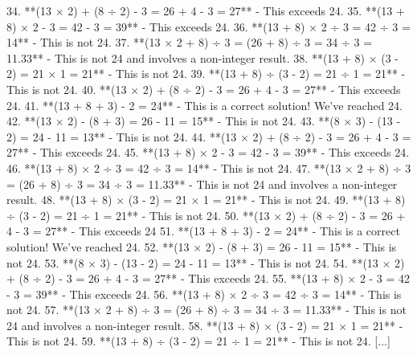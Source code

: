 \begin{dialogue}
\begin{small}
\begin{spverbatim}
34. **(13 × 2) + (8 ÷ 2) - 3 = 26 + 4 - 3 = 27**
    - This exceeds 24.
35. **(13 + 8) × 2 - 3 = 42 - 3 = 39**
    - This exceeds 24.
36. **(13 + 8) × 2 ÷ 3 = 42 ÷ 3 = 14**
    - This is not 24.
37. **(13 × 2 + 8) ÷ 3 = (26 + 8) ÷ 3 = 34 ÷ 3 = 11.33**
    - This is not 24 and involves a non-integer result.
38. **(13 + 8) × (3 - 2) = 21 × 1 = 21**
    - This is not 24.
39. **(13 + 8) ÷ (3 - 2) = 21 ÷ 1 = 21**
    - This is not 24.
40. **(13 × 2) + (8 ÷ 2) - 3 = 26 + 4 - 3 = 27**
    - This exceeds 24.
41. **(13 + 8 + 3) - 2 = 24**
    - This is a correct solution! We've reached 24.
42. **(13 × 2) - (8 + 3) = 26 - 11 = 15**
    - This is not 24.
43. **(8 × 3) - (13 - 2) = 24 - 11 = 13**
    - This is not 24.
44. **(13 × 2) + (8 ÷ 2) - 3 = 26 + 4 - 3 = 27**
    - This exceeds 24.
45. **(13 + 8) × 2 - 3 = 42 - 3 = 39**
    - This exceeds 24.
46. **(13 + 8) × 2 ÷ 3 = 42 ÷ 3 = 14**
    - This is not 24.
47. **(13 × 2 + 8) ÷ 3 = (26 + 8) ÷ 3 = 34 ÷ 3 = 11.33**
    - This is not 24 and involves a non-integer result.
48. **(13 + 8) × (3 - 2) = 21 × 1 = 21**
    - This is not 24.
49. **(13 + 8) ÷ (3 - 2) = 21 ÷ 1 = 21**
    - This is not 24.
50. **(13 × 2) + (8 ÷ 2) - 3 = 26 + 4 - 3 = 27**
    - This exceeds 24
51. **(13 + 8 + 3) - 2 = 24**
    - This is a correct solution! We've reached 24.
52. **(13 × 2) - (8 + 3) = 26 - 11 = 15**
    - This is not 24.
53. **(8 × 3) - (13 - 2) = 24 - 11 = 13**
    - This is not 24.
54. **(13 × 2) + (8 ÷ 2) - 3 = 26 + 4 - 3 = 27**
    - This exceeds 24.
55. **(13 + 8) × 2 - 3 = 42 - 3 = 39**
    - This exceeds 24.
56. **(13 + 8) × 2 ÷ 3 = 42 ÷ 3 = 14**
    - This is not 24.
57. **(13 × 2 + 8) ÷ 3 = (26 + 8) ÷ 3 = 34 ÷ 3 = 11.33**
    - This is not 24 and involves a non-integer result.
58. **(13 + 8) × (3 - 2) = 21 × 1 = 21**
    - This is not 24.
59. **(13 + 8) ÷ (3 - 2) = 21 ÷ 1 = 21**
    - This is not 24.
[...]
\end{spverbatim}\end{small}
\end{dialogue}
